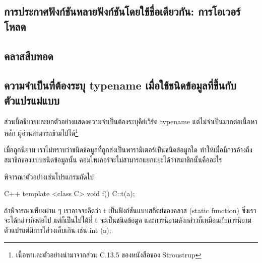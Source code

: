 \subsection{การ{\wbr}ประกาศ{\wbr}ฟังก์ชัน{\wbr}หลาย{\wbr}ฟังก์ชัน{\wbr}โดย{\wbr}ใช้{\wbr}ชื่อ{\wbr}เดียวกัน: การ{\wbr}โอ{\wbr}เวอร์{\wbr}โหลด}

\subsection{ค{\wbr}ลา{\wbr}ส{\wbr}สืบทอด}

\subsection{ความจำ{\wbr}เป็น{\wbr}ที่{\wbr}ต้อง{\wbr}ระบุ {\ct typename} เมื่อ{\wbr}ใช้{\wbr}ชนิด{\wbr}ข้อมูล{\wbr}ที่{\wbr}ขึ้น{\wbr}กับ{\wbr}ตัวแปร{\wbr}แม่แบบ}
\label{section:abs-typename}

ส่วน{\wbr}นี้{\wbr}อธิบาย{\wbr}และ{\wbr}ยก{\wbr}ตัวอย่าง{\wbr}แสดง{\wbr}ความจำ{\wbr}เป็น{\wbr}ต้อง{\wbr}ระบุ{\wbr}คีย์{\wbr}เวิร์ด {\ct typename}
แต่{\wbr}ไม่{\wbr}จำเป็น{\wbr}มาก{\wbr}ต่อ{\wbr}เนื้อหา{\wbr}หลัก{\wbr}
ผู้อ่าน{\wbr}สามารถ{\wbr}ข้าม{\wbr}ไป{\wbr}ได้\footnote{เนื้อหา{\wbr}และ{\wbr}ตัวอย่าง{\wbr}นำมา{\wbr}จาก{\wbr}ส่วน C.13.5 ของ{\wbr}หนังสือ{\wbr}ของ{\wbr}
  Stroustrup}

เมื่อ{\wbr}ถูก{\wbr}นิยาม เรา{\wbr}ไม่{\wbr}ทราบ{\wbr}ว่า{\wbr}ชนิด{\wbr}ข้อมูล{\wbr}ที่{\wbr}ถูก{\wbr}ส่ง{\wbr}เป็น{\wbr}พารามิเตอร์{\wbr}เป็น{\wbr}ชนิด{\wbr}ข้อมูล{\wbr}ใด{\wbr}
ทำ{\wbr}ให้{\wbr}เมื่อ{\wbr}มี{\wbr}การ{\wbr}อ้าง{\wbr}ถึง{\wbr}สมาชิก{\wbr}ของ{\wbr}แบบ{\wbr}ชนิด{\wbr}ข้อมูล{\wbr}นั้น{\wbr}
คอม{\wbr}ไพ{\wbr}เลอร์{\wbr}จะ{\wbr}ไม่{\wbr}สามารถ{\wbr}แยกแยะ{\wbr}ได้{\wbr}ว่า{\wbr}สมาชิก{\wbr}นั้น{\wbr}คือ{\wbr}อะไร{\wbr}

พิจารณา{\wbr}ตัวอย่าง{\wbr}เช่น{\wbr}โปรแกรม{\wbr}ถัด{\wbr}ไป{\wbr}

\latintext
\begin{codelist}{C++}{}
template <class C> void f()
{
  C::t(a);
}
\end{codelist}
\thaitext

ถ้า{\wbr}พิจารณา{\wbr}เพียง{\wbr}ผ่าน ๆ เรา{\wbr}อาจ{\wbr}จะ{\wbr}คิด{\wbr}ว่า {\ct t} เป็น{\wbr}ฟังก์ชัน{\wbr}แบบ{\wbr}สถิตย์{\wbr}ของ{\wbr}ค{\wbr}ลา{\wbr}ส (static
function) ซึ่ง{\wbr}เรา{\wbr}จะ{\wbr}ได้{\wbr}กล่าว{\wbr}ถึง{\wbr}ต่อไป แต่{\wbr}ก็{\wbr}เป็น{\wbr}ไป{\wbr}ได้{\wbr}ที่ {\ct t} จะ{\wbr}เป็น{\wbr}ชนิด{\wbr}ข้อมูล{\wbr}
และ{\wbr}การ{\wbr}นิยาม{\wbr}ดังกล่าว{\wbr}ก็{\wbr}เหมือน{\wbr}กับ{\wbr}การ{\wbr}นิยาม{\wbr}ตัวแปร{\wbr}แต่{\wbr}มี{\wbr}การ{\wbr}ใส่{\wbr}วงเล็บ{\wbr}เกิน เช่น {\ct int (a);}

